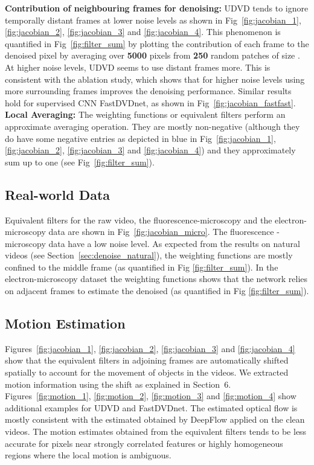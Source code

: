 \documentclass[final]{cvpr}
\begin{document}
\noindent \textbf{Contribution of neighbouring frames for denoising:} UDVD tends to ignore temporally distant frames at lower noise levels as shown in Fig~\ref{fig:jacobian_1}, \ref{fig:jacobian_2}, \ref{fig:jacobian_3} and \ref{fig:jacobian_4}. This phenomenon is quantified in Fig~\ref{fig:filter_sum} by plotting the contribution of each frame to the denoised pixel by averaging over \textbf{5000} pixels from \textbf{250} random patches of size . At higher noise levels, UDVD seems to use distant frames more. This is consistent with the ablation study, which shows that for higher noise levels using more surrounding frames improves the denoising performance. 
Similar results hold for supervised CNN FastDVDnet, as shown in Fig~\ref{fig:jacobian_fastfast}. \\

\noindent \textbf{Local Averaging:} The weighting functions or equivalent filters perform an approximate averaging operation. They are mostly non-negative (although they do have some negative entries as depicted in blue in Fig~\ref{fig:jacobian_1}, \ref{fig:jacobian_2}, \ref{fig:jacobian_3} and \ref{fig:jacobian_4}) and they approximately sum up to one (see Fig~\ref{fig:filter_sum}). 




\subsection{Real-world Data}

Equivalent filters for the raw video, the fluorescence-microscopy and the electron-microscopy data are shown in Fig~\ref{fig:jacobian_micro}. The fluorescence -microscopy data have a low noise level. As expected from the results on natural videos (see Section~\ref{sec:denoise_natural}), the weighting functions are mostly confined to the middle frame (as quantified in Fig \ref{fig:filter_sum}). In the electron-microscopy dataset the weighting functions shows that the network relies on adjacent frames to estimate the denoised (as quantified in Fig \ref{fig:filter_sum}). 



\subsection{Motion Estimation}
Figures~\ref{fig:jacobian_1}, \ref{fig:jacobian_2}, \ref{fig:jacobian_3} and \ref{fig:jacobian_4} show that the equivalent filters in adjoining frames are automatically shifted spatially to account for the movement of objects in the videos. We extracted motion information using the shift as explained in Section~6. Figures~\ref{fig:motion_1}, \ref{fig:motion_2}, \ref{fig:motion_3} and \ref{fig:motion_4} show additional examples for UDVD and FastDVDnet. The estimated optical flow is mostly consistent with the estimated obtained by DeepFlow \cite{deepflow} applied on the clean videos. The motion estimates obtained from the equivalent filters tends to be less accurate for pixels near strongly correlated features or highly homogeneous regions where the local motion is ambiguous. 
\label{sec:motion}
\end{document}
